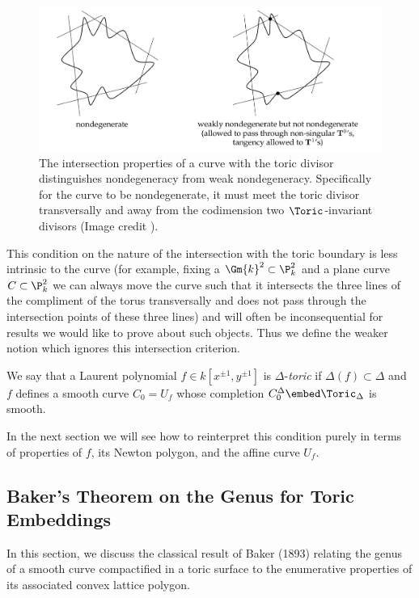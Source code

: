 \begin{figure}
\includegraphics[width=\textwidth]{nondegeneracy}
\caption{The intersection properties of a curve with the toric divisor distinguishes nondegeneracy from weak nondegeneracy. Specifically for the curve to be nondegenerate, it must meet the toric divisor transversally and away from the codimension two $\Toric$-invariant divisors (Image credit \cite{WC_preface}).}
\end{figure}
\par
This condition on the nature of the intersection with the toric boundary is less intrinsic to the curve (for example, fixing a $\Gm{k}^2 \subset \P^2_k$ and a plane curve $C \subset \P^2_k$ we can always move the curve such that it intersects the three lines of the compliment of the torus transversally and does not pass through the intersection points of these three lines) and will often be inconsequential for results we would like to prove about such objects. Thus we define the weaker notion which ignores this intersection criterion.

\begin{defn}
We say that a Laurent polynomial $f \in k[x^{\pm 1}, y^{\pm 1}]$ is $\Delta$-\textit{toric} if $\Delta(f) \subset \Delta$ and $f$ defines a smooth curve $C_0 = U_f$ whose completion $C^\Delta_0 \embed \Toric_\Delta$ is smooth.
\end{defn}
\noindent
In the next section we will see how to reinterpret this condition purely in terms of properties of $f$, its Newton polygon, and the affine curve $U_f$.


\subsection{Baker's Theorem on the Genus for Toric Embeddings}

In this section, we discuss the classical result of Baker (1893) relating the genus of a smooth curve compactified in a toric surface to the enumerative properties of its associated convex lattice polygon.

